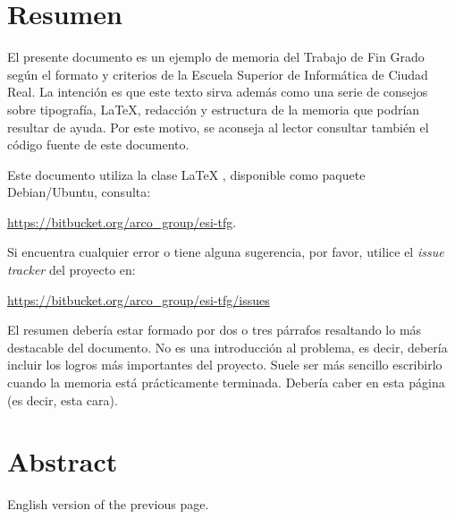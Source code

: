 \chapter{Resumen}


El presente documento es un ejemplo de memoria del Trabajo de Fin Grado según el
formato y criterios de la Escuela Superior de Informática de Ciudad Real. La
intención es que este texto sirva además como una serie de consejos sobre
tipografía, \LaTeX, redacción y estructura de la memoria que podrían resultar de
ayuda. Por este motivo, se aconseja al lector consultar también el código fuente
de este documento.

Este documento utiliza la clase \LaTeX{} \esitfg{}, disponible como paquete
Debian/Ubuntu, consulta:

 \url{https://bitbucket.org/arco_group/esi-tfg}.

Si encuentra cualquier error o tiene alguna sugerencia, por favor, utilice
el \emph{issue tracker} del proyecto \esitfg{} en:

\url{https://bitbucket.org/arco_group/esi-tfg/issues}

El resumen debería estar formado por dos o tres párrafos resaltando lo más
destacable del documento. No es una introducción al problema, es decir, debería
incluir los logros más importantes del proyecto. Suele ser más sencillo
escribirlo cuando la memoria está prácticamente terminada. Debería caber en esta
página (es decir, esta cara).


\chapter{Abstract}

English version of the previous page.
